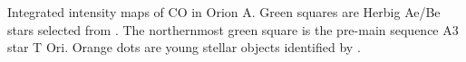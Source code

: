 \label{fig:OrionA_CO} Integrated intensity maps of CO in Orion A. Green squares are Herbig Ae/Be stars selected from \citet{2014yCat....1.2023S}. The northernmost green square is the pre-main sequence A3 star T Ori. Orange dots are young stellar objects identified by \citet{Megeath12}.

